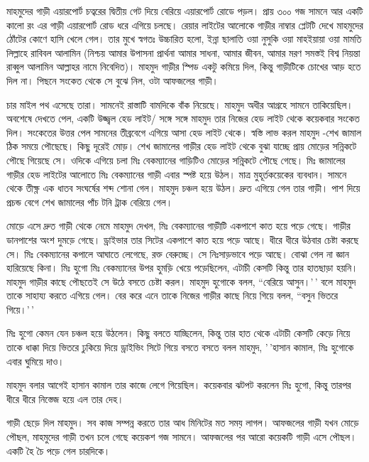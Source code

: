 \documentclass[
]{book}
\begin{document}
মাহমুদের গাড়ী এয়ারপোর্ট চত্বরের দ্বিতীয় গেট দিয়ে বেরিয়ে এয়ারপোর্ট রোডে পড়ল। প্রায় ৩০০ গজ সামনে আর একটি কালো রং এর গাড়ী এয়ারপোর্ট রোড ধরে এগিয়ে চলছে। রেয়ার লাইটের আলোকে গাড়ীর নাম্বার প্লেটটি দেখে মাহমুদের ঠোঁটের কোণে হাসি খেলে গেল। তার মুখে স্বগতঃ উচ্চারিত হলো, ইন্না ছালাতি ওয়া নুসুকি ওয়া মাহইয়ায়া ওয়া মামতি লিল্লাহে রাবিবল আলামিন (নিশ্চয় আমার উপাসনা প্রার্থনা আমার সাধনা, আমার জীবন, আমার মরণ সমস্তই বিশ্ব নিয়ন্তা রাব্বুল আলামিন আল্লাহর নামে নিবেদিত)। মাহমুদ গাড়ীর স্পিড একটু কমিয়ে দিল, কিন্তু গাড়ীটিকে চোখের আড় হতে দিল না। পিছনে সংকেত থেকে সে বুঝে নিল, ওটা আফজলের গাড়ী।

চার মাইল পথ এসেছে তারা। সামনেই রাস্তাটি বামদিকে বাঁক নিয়েছে। মাহমুদ অধীর আগ্রহে সামনে তাকিয়েছিল। অবশেষে দেখতে পেল, একটি উজ্জ্বল হেড লাইট/ সঙ্গে সঙ্গে মাহমুদ তার নিজের হেড লাইট থেকে কয়েকবার সংকেত দিল। সংকেতের উত্তর পেল সামনের তীব্রবেগে এগিয়ে আসা হেড লাইট থেকে। স্বস্তি লাভ করল মাহমুদ -শেখ জামাল ঠিক সময়ে পৌছেছে। কিছু দূরেই মোড়। শেখ জামালের গাড়ীর হেড লাইট থেকে বুঝা যাচ্ছে প্রায় মোড়ের সন্নিকটে পৌছে গিয়েছে সে। ওদিকে এগিয়ে চলা মিঃ বেকম্যানের গাড়িটিও মোড়ের সন্নি্কটে পৌছে গেছে। মিঃ জামালের গাড়ীর হেড লাইটের আলোতে মিঃ বেকম্যানের গাড়ী এবার স্পষ্ট হয়ে উঠল। মাত্র মুহূর্তকয়েকের ব্যবধান। সামনে থেকে তীক্ষ্ণ এক ধাতব সংঘর্ষের শব্দ শোনা গেল। মাহমুদ চঞ্চল হয়ে উঠল। দ্রুত এগিয়ে গেল তার গাড়ী। পাশ দিয়ে প্রচন্ড বেগে শেখ জামালের পাঁচ টনি ট্রাক বেরিয়ে গেল।

মোড়ে এসে দ্রুত গাড়ী থেকে নেমে মাহমুদ দেখল, মিঃ বেকম্যানের গাড়ীটি একপাশে কাত হয়ে পড়ে গেছে। গাড়ীর ডানপাশের অংশ দুমড়ে গেছে। ড্রাইভার তার সিটের একপাশে কাত হয়ে পড়ে আছে। ধীরে ধীরে উঠবার চেষ্টা করছে সে। মিঃ বেকম্যানের কপালে আঘাতে লেগেছে, রক্ত বেরুচ্ছে। সে নিঃসাড়ভাবে পড়ে আছে। বোঝা গেল না জ্ঞান হারিয়েছে কিনা। মিঃ হুগো মিঃ বেকম্যানের উপর হুমড়ি খেয়ে পড়েছিলেন, এটাচী কেসটি কিন্তু তার হাতছাড়া হয়নি। মাহমুদ গাড়ীর কাছে পৌছতেই সে উঠে বসতে চেষ্টা করল। মাহমুদ হুগোকে বলল, ``বেরিয়ে আসুন।'\,' বলে মাহমুদ তাকে সাহায্য করতে এগিয়ে গেল। বের করে এনে তাকে নিজের গাড়ীর কাছে নিয়ে গিয়ে বলল, ``বসুন ভিতরে গিয়ে।'\,'

মিঃ হুগো কেমন যেন চঞ্চল হয়ে উঠলেন। কিছু বলতে যাচ্ছিলেন, কিন্তু তার হাত থেকে এটাচী কেসটি কেড়ে নিয়ে তাকে ধাক্কা দিয়ে ভিতরে ঢুকিয়ে দিয়ে ড্রাইভিং সিটে গিয়ে বসতে বসতে বলল মাহমুদ, '\,'হাসান কামাল, মিঃ হুগোকে এবার ঘুমিয়ে দাও।

মাহমুদ বলার আগেই হাসান কামাল তার কাজে লেগে গিয়েছিল। কয়েকবার ঝটপট করলেন মিঃ হুগো, কিন্তু তারপর ধীরে ধীরে নিস্তেজ হয়ে এল তার দেহ।

গাড়ী ছেড়ে দিল মাহমুদ। সব কাজ সম্পন্ন করতে তার আধ মিনিটের মত সময় লাগল। আফজলের গাড়ী যখন মোড়ে পৌছল, মাহমুদের গাড়ী তখন চলে গেছে কয়েকশ গজ সামনে। আফজলের পর আরো কয়েকটি গাড়ী এসে পৌছল। একটি হৈ চৈ পড়ে গেল চারদিকে।
\end{document}
